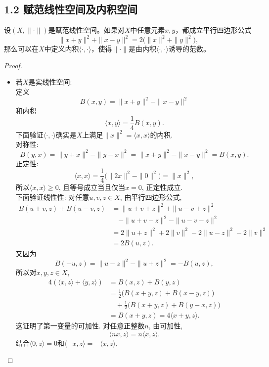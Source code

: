 \subsection{1.2 赋范线性空间及内积空间}
\begin{11}
    设$(X,\|\cdot\|)$是赋范线性空间。如果对$X$中任意元素$x,y$，都成立平行四边形公式
    $$\|x+y\|^2+\|x-y\|^2=2\bigl(\|x\|^2+\|y\|^2\bigr),$$
    那么可以在$X$中定义内积$\langle\cdot,\cdot\rangle$，使得$\|\cdot\|$是由内积$\langle\cdot,\cdot\rangle$诱导的范数。
\end{11}
\begin{proof}
    \begin{itemize}
        \item[(1)] 若$X$是实线性空间:\\
        定义
        $$B(x,y)=\|x+y\|^2-\|x-y\|^2$$
        和内积
        $$\langle x,y\rangle =\frac{1}{4}B(x,y).$$
        下面验证$\langle \cdot,\cdot\rangle $确实是$X$上满足$\|x\|^2=\langle x,x\rangle $的内积.\\
        对称性:
        $$B(y,x)=\|y+x\|^2-\|y-x\|^2
        =\|x+y\|^2-\|x-y\|^2=B(x,y).$$
        正定性:
        $$\langle x,x\rangle =\frac14\bigl(\|2x\|^2-\|0\|^2\bigr)=\|x\|^2,$$
        所以$\langle x,x\rangle \ge0$, 且等号成立当且仅当$x=0$, 正定性成立.\\
        下面验证线性性:
        对任意$u,v,z\in X$, 由平行四边形公式,
        \begin{align*}
            B(u+v,z)+B(u-v,z)
            &=\|u+v+z\|^2+\|u-v+z\|^2\\
            &\quad-\|u+v-z\|^2-\|u-v-z\|^2\\
            &=2\|u+z\|^2+2\|v\|^2
            -2\|u-z\|^2-2\|v\|^2\\
            &=2B(u,z).
        \end{align*}
        又因为
        $$B(-u,z)=\|u-z\|^2-\|u+z\|^2=-B(u,z),$$
        所以对$x,y,z\in X$,
        \begin{align*}
            4(\langle x,z\rangle +\langle y,z\rangle )
            &=B(x,z)+B(y,z)\\
            &=\frac12\bigl(B(x+y,z)+B(x-y,z)\bigr)\\
            &\quad+\frac12\bigl(B(x+y,z)+B(y-x,z)\bigr)\\
            &=B(x+y,z)
            =4\langle x+y,z\rangle .
        \end{align*}
        这证明了第一变量的可加性.
        对任意正整数$n$, 由可加性,
        $$\langle nx,z\rangle =n\langle x,z\rangle .$$
        结合$\langle 0,z\rangle =0$和$\langle -x,z\rangle =-\langle x,z\rangle $,

\end{itemize}
\end{proof}
